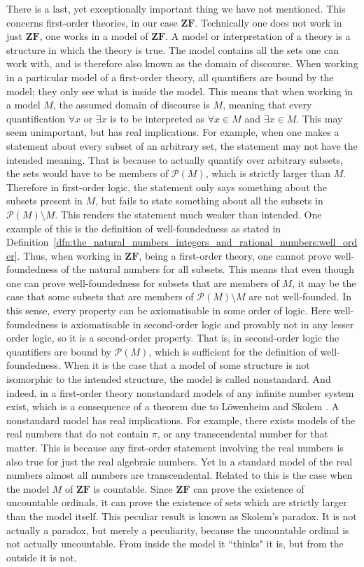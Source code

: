 \documentclass[../main.tex]{subfiles}
\begin{document}
There is a last, yet exceptionally important thing we have not mentioned. This concerns first-order theories, in our case $\mathbf{ZF}$. Technically one does not work in just $\mathbf{ZF}$, one works in a model of $\mathbf{ZF}$. A model or interpretation of a theory is a structure in which the theory is true. The model contains all the sets one can work with, and is therefore also known as the domain of discourse. When working in a particular model of a first-order theory, all quantifiers are bound by the model; they only see what is inside the model. This means that when working in a model $M$, the assumed domain of discourse is $M$, meaning that every quantification $\forall x$ or $\exists x$ is to be interpreted as $\forall x\in M$ and $\exists x\in M$. This may seem unimportant, but has real implications. For example, when one makes a statement about every subset of an arbitrary set, the statement may not have the intended meaning. That is because to actually quantify over arbitrary subsets, the sets would have to be members of $\mathcal{P}(M)$, which is strictly larger than $M$. Therefore in first-order logic, the statement only says something about the subsets present in $M$, but fails to state something about all the subsets in $\mathcal{P}(M)\setminus M$. This renders the statement much weaker than intended. One example of this is the definition of well-foundedness as stated in Definition~\ref{dfn:the_natural_numbers_integers_and_rational_numbers:well_order}. Thus, when working in $\mathbf{ZF}$, being a first-order theory, one cannot prove well-foundedness of the natural numbers for all subsets. This means that even though one can prove well-foundedness for subsets that are members of $M$, it may be the case that some subsets that are members of $\mathcal{P}(M)\setminus M$ are not well-founded. In this sense, every property can be axiomatisable in some order of logic. Here well-foundedness is axiomatisable in second-order logic and provably not in any lesser order logic, so it is a second-order property. That is, in second-order logic the quantifiers are bound by $\mathcal{P}(M)$, which is sufficient for the definition of well-foundedness. When it is the case that a model of some structure is not isomorphic to the intended structure, the model is called nonstandard. And indeed, in a first-order theory nonstandard models of any infinite number system exist, which is a consequence of a theorem due to Löwenheim and Skolem \cite{Skolem1934}. A nonstandard model has real implications. For example, there exists models of the real numbers that do not contain $\pi$, or any transcendental number for that matter. This is because any first-order statement involving the real numbers is also true for just the real algebraic numbers. Yet in a standard model of the real numbers almost all numbers are transcendental. Related to this is the case when the model $M$ of $\mathbf{ZF}$ is countable. Since $\mathbf{ZF}$ can prove the existence of uncountable ordinals, it can prove the existence of sets which are strictly larger than the model itself. This peculiar result is known as Skolem's paradox. It is not actually a paradox, but merely a peculiarity, because the uncountable ordinal is not actually uncountable. From inside the model it ``thinks" it is, but from the outside it is not.
\end{document}
